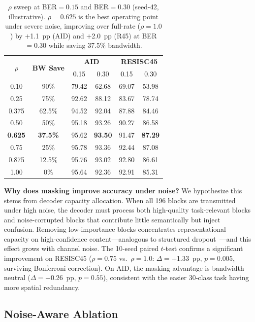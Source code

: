 \documentclass[conference]{IEEEtran}
\begin{document}
\begin{table}[t]
\renewcommand{\arraystretch}{1.12}
\centering
\caption{$\rho$ sweep at BER$=0.15$ and BER$=0.30$ (seed-42, illustrative). $\rho{=}0.625$ is the best operating point under severe noise, improving over full-rate ($\rho{=}1.0$) by $+$1.1~pp (AID) and $+$2.0~pp (R45) at BER$=0.30$ while saving 37.5\% bandwidth.}
\label{tab:rho_sweep}
\setlength{\tabcolsep}{2.5pt}
\begin{tabular}{c c cccc}
\toprule
\multirow{2}{*}{$\rho$} & \multirow{2}{*}{\textbf{BW Save}} & \multicolumn{2}{c}{\textbf{AID}} & \multicolumn{2}{c}{\textbf{RESISC45}} \\
& & 0.15 & 0.30 & 0.15 & 0.30 \\
\midrule
0.10 & 90\% & 79.42 & 62.68 & 69.07 & 53.98 \\
0.25 & 75\% & 92.62 & 88.12 & 83.67 & 78.74 \\
0.375 & 62.5\% & 94.52 & 92.04 & 87.88 & 84.46 \\
0.50 & 50\% & 95.18 & 93.26 & 90.27 & 86.58 \\
\textbf{0.625} & \textbf{37.5\%} & 95.62 & \textbf{93.50} & 91.47 & \textbf{87.29} \\
0.75 & 25\% & 95.78 & 93.36 & 92.44 & 87.08 \\
0.875 & 12.5\% & 95.76 & 93.02 & 92.80 & 86.61 \\
1.00 & 0\% & 95.64 & 92.36 & 92.91 & 85.31 \\
\bottomrule
\end{tabular}
\end{table}

\textbf{Why does masking improve accuracy under noise?} We hypothesize this stems from decoder capacity allocation. When all 196 blocks are transmitted under high noise, the decoder must process both high-quality task-relevant blocks and noise-corrupted blocks that contribute little semantically but inject confusion. Removing low-importance blocks concentrates representational capacity on high-confidence content---analogous to structured dropout~\cite{ghiasi2018dropblock}---and this effect grows with channel noise. The 10-seed paired $t$-test confirms a significant improvement on RESISC45 ($\rho{=}0.75$ vs.\ $\rho{=}1.0$: $\Delta{=}+$1.33~pp, $p{=}0.005$, surviving Bonferroni correction). On AID, the masking advantage is bandwidth-neutral ($\Delta{=}+$0.26~pp, $p{=}0.55$), consistent with the easier 30-class task having more spatial redundancy.


\subsection{Noise-Aware Ablation}
\end{document}

